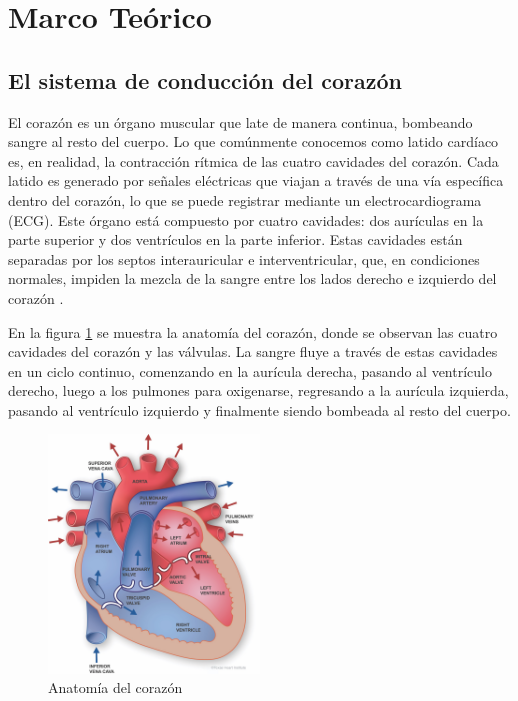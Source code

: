 \newpage
\section{Marco Teórico}

    \subsection{El sistema de conducción del corazón}

    El corazón es un órgano muscular que late de manera continua, bombeando sangre al resto del cuerpo. Lo que comúnmente conocemos como latido cardíaco es, en realidad, la contracción rítmica de las cuatro cavidades del corazón. Cada latido es generado por señales eléctricas que viajan a través de una vía específica dentro del corazón, lo que se puede registrar mediante un electrocardiograma (ECG). Este órgano está compuesto por cuatro cavidades: dos aurículas en la parte superior y dos ventrículos en la parte inferior. Estas cavidades están separadas por los septos interauricular e interventricular, que, en condiciones normales, impiden la mezcla de la sangre entre los lados derecho e izquierdo del corazón \cite{tresguerres_2005}.

    En la figura \ref{fig:corazon} se muestra la anatomía del corazón, donde se observan las cuatro cavidades del corazón y las válvulas. La sangre fluye a través de estas cavidades en un ciclo continuo, comenzando en la aurícula derecha, pasando al ventrículo derecho, luego a los pulmones para oxigenarse, regresando a la aurícula izquierda, pasando al ventrículo izquierdo y finalmente siendo bombeada al resto del cuerpo.

    \begin{figure}[H]
        \centering
        \includegraphics[width=0.5\textwidth]{img/Marco/corazon.jpg}
        \caption[Anatomía del corazón]{Anatomía del corazón\footnotemark}
        \label{fig:corazon}
    \end{figure}

